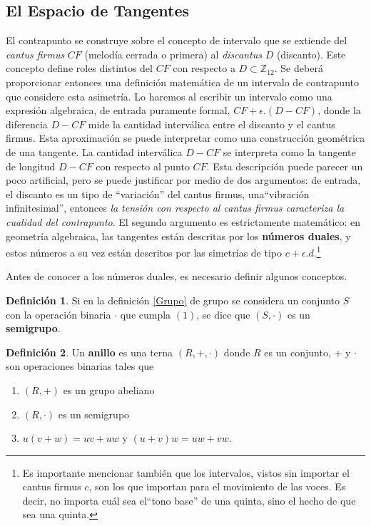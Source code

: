 \documentclass[letterpaper,12pt]{book}
\theoremstyle{definition} \newtheorem{Def}{Definición}[chapter]
\theoremstyle{definition} \newtheorem{Teo}{Teorema}[chapter]
\theoremstyle{definition} \newtheorem{Pro}{Proposición}[chapter]
\theoremstyle{definition} \newtheorem{Lema}{Lema}[chapter]
\begin{document}
\subsection{El Espacio de Tangentes}
  
  El contrapunto se construye sobre el concepto de intervalo que se extiende del  \emph{cantus firmus} $CF$ (melodía cerrada o primera) al \emph{discantus} $D$ (discanto). Este concepto define roles distintos del $CF$ con respecto a $D \subset \mathbb{Z}_{12}$. Se deberá proporcionar entonces una definición matemática de un intervalo de contrapunto que considere esta asimetría. Lo haremos al escribir un intervalo como una expresión algebraica, de entrada puramente formal, $CF+\epsilon.(D-CF)$, donde la diferencia $D-CF$ mide la cantidad interválica entre el discanto y el cantus firmus. Esta aproximación se puede interpretar como una construcción geométrica de una tangente. La cantidad interválica $D-CF$ se interpreta como la tangente de longitud $D-CF$ con respecto al punto $CF$. Esta descripción puede parecer un poco artificial, pero se puede justificar por medio de dos argumentos: de entrada, el discanto es un tipo de ``variación'' del cantus firmus, una``vibración infinitesimal'',  entonces \emph{la tensión con respecto al cantus firmus caracteriza la cualidad del contrapunto}. El segundo argumento es estrictamente matemático: en geometría algebraica, las tangentes están descritas por los \textbf{números duales}, y estos números a su vez están descritos por las simetrías de tipo $c+\epsilon.d$.\footnote{Es importante mencionar también que los intervalos, vistos sin importar el cantus firmus $c$, son los que importan para el movimiento de las voces. Es decir, no importa cuál sea el``tono base'' de una quinta, sino el hecho de que sea una quinta.} 
  
  Antes de conocer a los números duales, es necesario definir algunos conceptos.
  
\begin{Def}
 Si en la definición \ref{Grupo} de grupo  se considera un conjunto $S$ con la operación binaria $\cdot$ que cumpla $(1)$, se dice que $(S,\cdot)$ es un \textbf{semigrupo}.
\end{Def} 
  
 \begin{Def}
 Un \textbf{anillo} es una terna $(R,+,\cdot)$ donde $R$ es un conjunto, $+$ y $\cdot$ son operaciones binarias tales que
 \begin{enumerate}
  \item $(R,+)$ es un grupo abeliano
  \item $(R, \cdot)$ es un semigrupo
  \item $u(v+w)=uv+uw$ y $(u+v)w=uw+vw$.
 \end{enumerate}  
\end{Def} 
  
\end{document}
